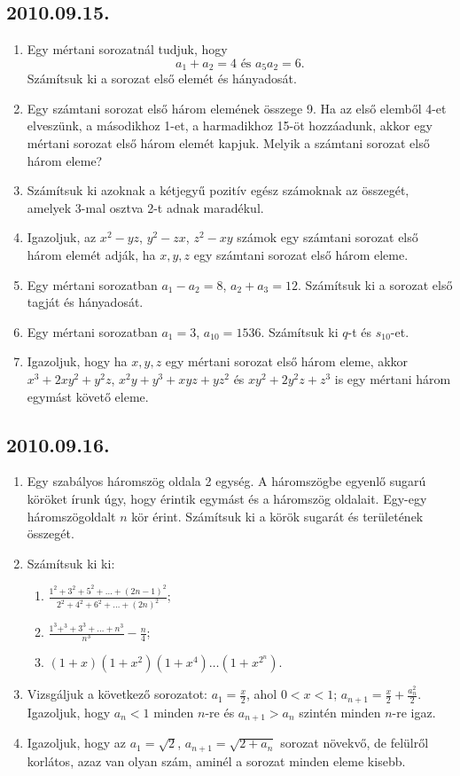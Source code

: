 \documentclass{article}
\newenvironment{abc}{\begin{enumerate}[label=\textit{\alph*})]}{\end{enumerate}}
\begin{document}
\subsection*{2010.09.15.}
\begin{enumerate}
\item Egy mértani sorozatnál tudjuk, hogy 
$$a_1+a_2=4\text{~és~}a_5a_2=6.$$
Számítsuk ki a sorozat első elemét és hányadosát.
\item Egy számtani sorozat első három elemének összege 9. Ha az első elemből 4-et elveszünk, a másodikhoz 1-et, a harmadikhoz 15-öt hozzáadunk, akkor egy mértani sorozat első három elemét kapjuk. Melyik a számtani sorozat első három eleme?
\item Számítsuk ki azoknak a kétjegyű pozitív egész számoknak az összegét, amelyek 3-mal osztva 2-t adnak maradékul.
\item Igazoljuk, az $x^2-yz$, $y^2-zx$, $z^2-xy$ számok egy számtani sorozat első három elemét adják, ha $x,y,z$ egy számtani sorozat első három eleme.
\item Egy mértani sorozatban $a_1-a_2=8$, $a_2+a_3=12$. Számítsuk ki a sorozat első tagját és hányadosát.
\item Egy mértani sorozatban $a_1=3$, $a_{10}=1536$. Számítsuk ki $q$-t és $s_{10}$-et.
\item Igazoljuk, hogy ha $x,y,z$ egy mértani sorozat első három eleme, akkor 
$x^3+2xy^2+y^2z$,
$x^2y+y^3+xyz+yz^2$ és 
$xy^2+2y^2z+z^3$ is egy mértani három egymást követő eleme.
\end{enumerate}


\subsection*{2010.09.16.}
\begin{enumerate}
\item Egy szabályos háromszög oldala 2 egység. A háromszögbe egyenlő sugarú köröket írunk úgy, hogy érintik egymást és a háromszög oldalait. Egy-egy háromszögoldalt $n$ kör érint. Számítsuk ki a körök sugarát és területének összegét.
\item Számítsuk ki ki:
\begin{abc}
\item $\frac{1^2+3^2+5^2+\ldots+(2n-1)^2}{2^2+4^2+6^2+\ldots+(2n)^2}$;
\item $\frac{1^3+^3+3^3+\ldots+n^3}{n^3}-\frac{n}{4}$;
\item $(1+x)(1+x^2)(1+x^4)\ldots(1+x^{2^n})$.
\end{abc}
\item Vizsgáljuk a következő sorozatot:
$a_1=\frac{x}{2}$, ahol $0<x<1$; $a_{n+1}=\frac{x}{2}+\frac{a_n^2}{2}$. Igazoljuk, hogy $a_n<1$ minden $n$-re és $a_{n+1}>a_n$ szintén minden $n$-re igaz.

\item Igazoljuk, hogy az $a_1=\sqrt 2$, $a_{n+1}=\sqrt{2+a_n}$ sorozat növekvő, de felülről korlátos, azaz van olyan szám, aminél a sorozat minden eleme kisebb.
\end{enumerate}
\end{document}
